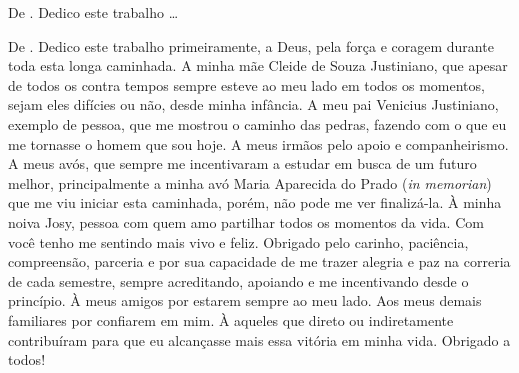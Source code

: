 \begin{dedicatoria}
\vspace*{\fill}
\vspace*{\fill}
\vspace*{\fill}
\vspace*{\fill}
\vspace*{\fill}
\vspace*{\fill}
De \imprimirAutorUm.
\newline
Dedico este trabalho \ldots 

\vspace*{\fill}
De \imprimirAutorDois.
\newline
Dedico este trabalho primeiramente, a Deus, pela força e coragem durante toda esta longa caminhada. A minha mãe Cleide de Souza Justiniano, que apesar de todos os contra tempos sempre esteve ao meu lado em todos os momentos, sejam eles difícies ou não, desde minha infância. A meu pai Venicius Justiniano, exemplo de pessoa, que me mostrou o caminho das pedras, fazendo com o que eu me tornasse o homem que sou hoje. A meus irmãos pelo apoio e companheirismo. A meus avós, que sempre me incentivaram a estudar em busca de um futuro melhor, principalmente a minha avó Maria Aparecida do Prado (\textit{in memorian}) que me viu iniciar esta caminhada, porém, não pode me ver finalizá-la. À minha noiva Josy, pessoa com quem amo partilhar todos os momentos da vida. Com você tenho me sentindo mais vivo e feliz. Obrigado pelo carinho, paciência, compreensão, parceria e por sua capacidade de me trazer alegria e paz na correria de cada semestre, sempre acreditando, apoiando e me incentivando desde o princípio. À meus amigos por estarem sempre ao meu lado. Aos meus demais familiares por confiarem em mim. À aqueles que direto ou indiretamente contribuíram para que eu alcançasse mais essa vitória em minha vida. Obrigado a todos!
\end{dedicatoria}
